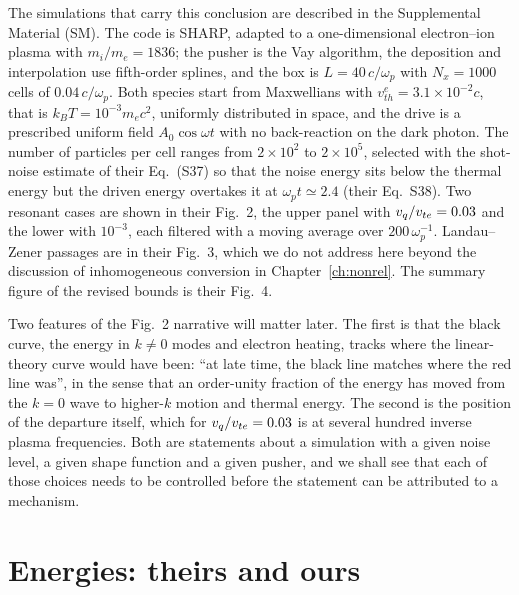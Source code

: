 The simulations that carry this conclusion are described in the Supplemental Material (SM). The code is SHARP, adapted to a one-dimensional electron--ion plasma with $m_i/m_e=1836$; the pusher is the Vay algorithm, the deposition and interpolation use fifth-order splines, and the box is $L=40\,c/\omega_p$ with $N_x=1000$ cells of $0.04\,c/\omega_p$. Both species start from Maxwellians with $v_{th}^e=3.1\times10^{-2}c$, that is $k_BT=10^{-3}m_ec^2$, uniformly distributed in space, and the drive is a prescribed uniform field $A_0\cos\omega t$ with no back-reaction on the dark photon. The number of particles per cell ranges from $2\times10^2$ to $2\times10^5$, selected with the shot-noise estimate of their Eq.~(S37) so that the noise energy sits below the thermal energy but the driven energy overtakes it at $\omega_pt\simeq2.4$ (their Eq.~S38). Two resonant cases are shown in their Fig.~2, the upper panel with $v_q/v_{te}=0.03$ and the lower with $10^{-3}$, each filtered with a moving average over $200\,\omega_p^{-1}$. Landau--Zener passages are in their Fig.~3, which we do not address here beyond the discussion of inhomogeneous conversion in Chapter~\ref{ch:nonrel}. The summary figure of the revised bounds is their Fig.~4.

Two features of the Fig.~2 narrative will matter later. The first is that the black curve, the energy in $k\neq0$ modes and electron heating, tracks where the linear-theory curve would have been: ``at late time, the black line matches where the red line was'', in the sense that an order-unity fraction of the energy has moved from the $k=0$ wave to higher-$k$ motion and thermal energy. The second is the position of the departure itself, which for $v_q/v_{te}=0.03$ is at several hundred inverse plasma frequencies. Both are statements about a simulation with a given noise level, a given shape function and a given pusher, and we shall see that each of those choices needs to be controlled before the statement can be attributed to a mechanism.

\section{Energies: theirs and ours}

